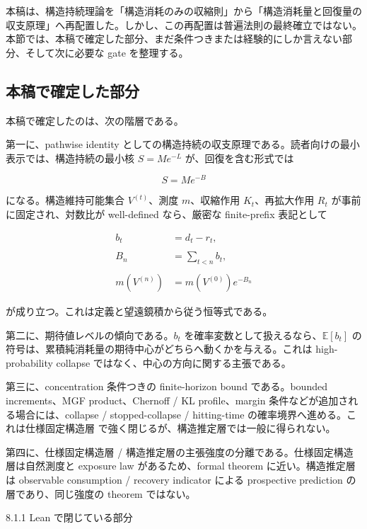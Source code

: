 \documentclass[12pt,a4paper]{article}
\begin{document}
本稿は、構造持続理論を「構造消耗のみの収縮則」から「構造消耗量と回復量の収支原理」へ再配置した。しかし、この再配置は普遍法則の最終確立ではない。本節では、本稿で確定した部分、まだ条件つきまたは経験的にしか言えない部分、そして次に必要な gate を整理する。

\subsection{本稿で確定した部分}\label{ux672cux7a3fux3067ux78baux5b9aux3057ux305fux90e8ux5206}

本稿で確定したのは、次の階層である。

第一に、pathwise identity としての構造持続の収支原理である。読者向けの最小表示では、構造持続の最小核 \(S=Me^{-L}\) が、回復を含む形式では

\[
S = M e^{-B}
\]

になる。構造維持可能集合 \(V^{(t)}\)、測度 \(m\)、収縮作用 \(K_{t}\)、再拡大作用 \(R_{t}\) が事前に固定され、対数比が well-defined なら、厳密な finite-prefix 表記として

\[
\begin{aligned}
b_{t}&=d_{t}-r_{t}, \\
\qquad \\
B_{n}&=\sum_{t<n}b_{t}, \\
\qquad \\
m(V^{(n)})&=m(V^{(0)})e^{-B_{n}}
\end{aligned}
\]

が成り立つ。これは定義と望遠鏡積から従う恒等式である。

第二に、期待値レベルの傾向である。\(b_{t}\) を確率変数として扱えるなら、\(\mathbb E[b_{t}]\) の符号は、累積純消耗量の期待中心がどちらへ動くかを与える。これは high-probability collapse ではなく、中心の方向に関する主張である。

第三に、concentration 条件つきの finite-horizon bound である。bounded increments、MGF product、Chernoff / KL profile、margin 条件などが追加される場合には、collapse / stopped-collapse / hitting-time の確率境界へ進める。これは仕様固定構造層 で強く閉じるが、構造推定層では一般に得られない。

第四に、仕様固定構造層 / 構造推定層の主張強度の分離である。仕様固定構造層は自然測度と exposure law があるため、formal theorem に近い。構造推定層は observable consumption / recovery indicator による prospective prediction の層であり、同じ強度の theorem ではない。

8.1.1 Lean で閉じている部分
\end{document}
